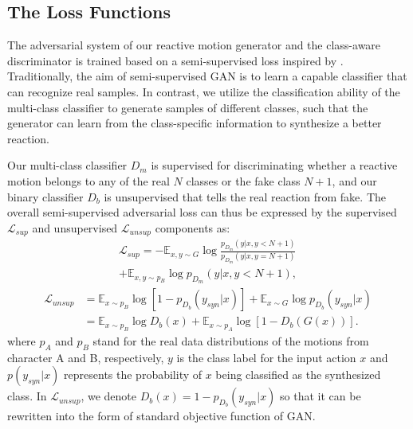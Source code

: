 \documentclass[times,twocolumn,final]{elsarticle}
\begin{document}
\subsection{The Loss Functions}
\label{sec:3.3}

The adversarial system of our reactive motion generator and the class-aware discriminator is trained based on a semi-supervised loss inspired by \cite{salimans2016improved}. Traditionally, the aim of semi-supervised GAN \cite{salimans2016improved,odena2016semi, kumar2017semi} is to learn a capable classifier that can recognize real samples. In contrast, we utilize the classification ability of the multi-class classifier to generate samples of different classes, such that the generator can learn from the class-specific information to synthesize a better reaction. 



Our multi-class classifier $D_{m}$ is supervised for discriminating whether a reactive motion belongs to any of the real $N$ classes or the fake class $N+1$, and our binary classifier $D_{b}$ is unsupervised that tells the real reaction from fake. The overall semi-supervised adversarial loss can thus be expressed by the supervised $\mathcal{L}_{sup}$ and unsupervised $\mathcal{L}_{unsup}$ components as:
\begin{multline}
\mathcal{L}_{sup}=-\mathbb{E}_{x,y\sim G}\log\frac{p_{D_{m}}(y|x,y<N+1)}{p_{D_{m}}(y|x,y=N+1)}\\
+\mathbb{E}_{x,y\sim p_{B}}\log p_{D_{m}}(y|x,y<N+1),\label{eq:sup}
\end{multline}
\begin{equation}
\begin{split}
\mathcal{L}_{unsup}&=\mathbb{E}_{x\sim p_{B}}\log [1-p_{D_{b}}(y_{syn}|x)]+\mathbb{E}_{x\sim G}\log p_{D_{b}}(y_{syn}|x)\\
&=\mathbb{E}_{x\sim p_{B}}\log D_{b}(x)+\mathbb{E}_{x\sim p_{A}}\log [1-D_{b}(G(x))].\label{eq:unsup}
\end{split}
\end{equation}
where $p_{A}$ and $p_{B}$ stand for the real data distributions of the motions from character A and B, respectively, $y$ is the class label for the input action $x$ and $p(y_{syn}|x)$ represents the probability of $x$ being classified as the synthesized class. In $\mathcal{L}_{unsup}$, we denote $D_{b}(x)=1-p_{D_{b}}(y_{syn}|x)$ so that it can be rewritten into the form of standard objective function of GAN. 
\end{document}
